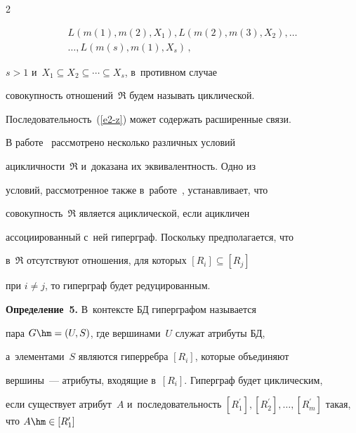 \begin{multicols}{2}
\vspace*{-4pt}



\noindent

\begin{multline}

L\left(m(1), m(2), X_1\right), L\left(m(2), m(3), X_2\right),\ldots\\

\ldots , L\left(m(s), m(1),

X_s\right)\,,

\label{e2-z}

\end{multline}

$s>1$ и~$X_1\subseteq X_2\subseteq \cdots \subseteq X_s$, в~противном случае

совокупность отношений~$\mathfrak{R}$ будем называть циклической.

Последовательность~(\ref{e2-z}) может содержать расширенные связи.



  В работе~\cite{9-z} рассмотрено несколько различных условий

ацикличности~$\mathfrak{R}$ и~доказана их эквивалентность. Одно из

условий, рассмотренное также в~работе~\cite{3-z}, устанавливает, что

совокупность~$\mathfrak{R}$ является ациклической, если ацикличен

ас\-со\-ци\-иро\-ван\-ный с~ней гиперграф. Поскольку предполагается, что

в~$\mathfrak{R}$ отсутствуют отношения, для которых $[R_i]\subseteq [R_j]$

при $i\not= j$, то гиперграф будет редуцированным.



\vspace*{2pt}



  \noindent

  \textbf{Определение~5.} В~контексте БД гиперграфом называется

пара $G\hm= (U,S)$, где вершинами~$U$ служат атрибуты БД,

а~элементами~$S$ являются гиперребра $[R_i]$, которые объединяют

вершины~--- атрибуты, входящие в~$[R_i]$. Гиперграф будет циклическим,

если существует атрибут~$A$ и~последовательность $[R_1^\prime],

[R_2^\prime],\ldots , [R_m^\prime]$ такая, что $A\hm\in [R_1^\prime]$


\end{multicols}
